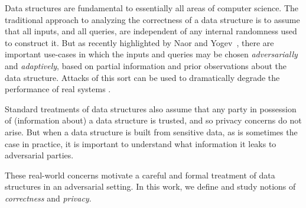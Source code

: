 \ignore{
  \begin{figure}
  \end{figure}
}
\label{sec:intro}
%
Data structures are fundamental to essentially all areas of computer science.  
The traditional approach to analyzing the correctness of a data structure 
is to assume that all inputs, and all queries, 
are independent of any internal randomness used to construct it. 
But as recently highlighted by Naor and
Yogev~\cite{naor2015bloom}, there are important use-cases in which the inputs and queries
may be chosen \emph{adversarially} and \emph{adaptively}, based on partial
information and prior observations about the data structure. Attacks of this
sort can be used to dramatically degrade the performance of real systems
\cite{crosby2003denial,gerbet2015power,lipton1993clocked}.

Standard treatments of data structures also assume that any party in
possession of (information about) a data structure is trusted, and so privacy
concerns do not arise.  But when a data structure is built from
sensitive data, as is sometimes the case in practice, it
is important to understand what information it leaks to adversarial parties.
%


These real-world concerns motivate a careful and formal treatment of data
structures in an adversarial setting.  In this work, we define and study notions
of \emph{correctness} and \emph{privacy}.

